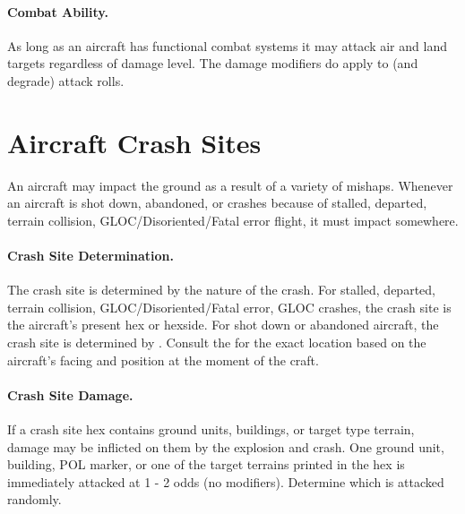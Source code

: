 \begin{advancedrules}
\paragraph{Combat Ability.} As long as an aircraft has functional combat systems it may attack air and land targets regardless of damage level. The damage modifiers do apply to (and degrade) attack rolls.


\section{Aircraft Crash Sites}


An aircraft may impact the ground as a result of a variety of mishaps. Whenever an aircraft is shot down, abandoned, or crashes because of stalled, departed, terrain collision, GLOC/Disoriented/Fatal error flight, it must impact somewhere.

\paragraph{Crash Site Determination.} The crash site is determined by the nature of the crash. For stalled, departed, terrain collision, GLOC/Disoriented/Fatal error, GLOC crashes, the crash site is the aircraft's present hex or hexside. For shot down or abandoned aircraft, the crash site is determined by . Consult the  for the exact location based on the aircraft's facing and position at the moment of the craft.

\paragraph{Crash Site Damage.} If a crash site hex contains ground units, buildings, or target type terrain, damage may be inflicted on them by the explosion and crash. One ground unit, building, POL marker, or one of the target terrains printed in the hex is immediately attacked at 1 - 2 odds (no modifiers). Determine which is attacked randomly. 
\end{advancedrules}

